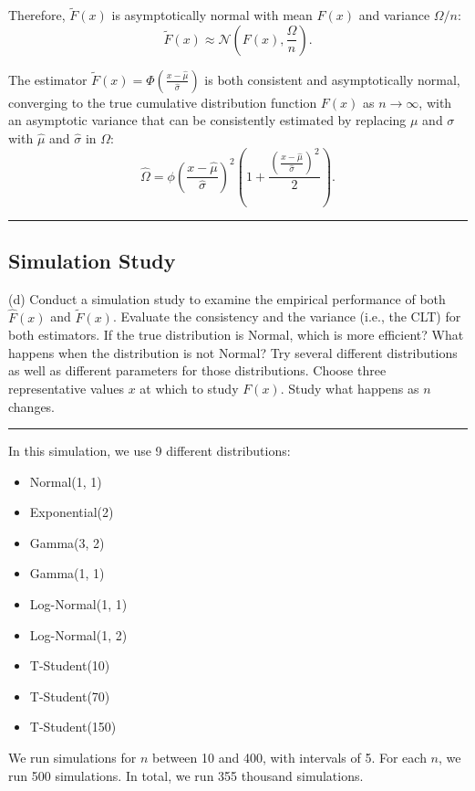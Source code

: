 \documentclass{article}
\newenvironment{colorparagraph}[1]{\par\color{#1}}{\par}
\begin{document}
Therefore, \( \tilde{F}(x) \) is asymptotically normal with mean \( F(x) \) and variance \( \Omega / n \):
\[
\tilde{F}(x) \approx \mathcal{N}\left( F(x), \frac{\Omega}{n} \right).
\]

The estimator \( \tilde{F}(x) = \Phi\left( \frac{x - \hat{\mu}}{\hat{\sigma}} \right) \) is both consistent and asymptotically normal, converging to the true cumulative distribution function \( F(x) \) as \( n \to \infty \), with an asymptotic variance that can be consistently estimated by replacing \( \mu \) and \( \sigma \) with \( \hat{\mu} \) and \( \hat{\sigma} \) in \( \Omega \):
\[
\hat{\Omega} = \phi\left( \frac{x - \hat{\mu}}{\hat{\sigma}} \right)^2 \left( 1 + \frac{\left( \frac{x - \hat{\mu}}{\hat{\sigma}} \right)^2}{2} \right).
\]

\begin{colorparagraph}{questioncolor}
\label{q2d}
\rule{\textwidth}{0.5pt}
\subsection{Simulation Study}
(d) Conduct a simulation study to examine the empirical performance of both \( \hat{F}(x) \) and \( \tilde{F}(x) \).
Evaluate the consistency and the variance (i.e., the CLT) for both estimators. If the true distribution is Normal, which is more efficient? What happens when the distribution is not Normal? Try several different distributions as well as different parameters for those distributions. Choose three representative values \( x \) at which to study \( F(x) \). Study what happens as \( n \) changes.

\rule{\textwidth}{0.5pt}
\end{colorparagraph}

In this simulation, we use 9 different distributions:
\begin{itemize}
  \item Normal(1, 1)
  \item Exponential(2)
  \item Gamma(3, 2)
  \item Gamma(1, 1)
  \item Log-Normal(1, 1)
  \item Log-Normal(1, 2)
  \item T-Student(10)
  \item T-Student(70)
  \item T-Student(150)
\end{itemize}

We run simulations for $n$ between 10 and 400, with intervals of 5. For each $n$, we run 500 simulations. In total, we run 355 thousand simulations.
\end{document}
